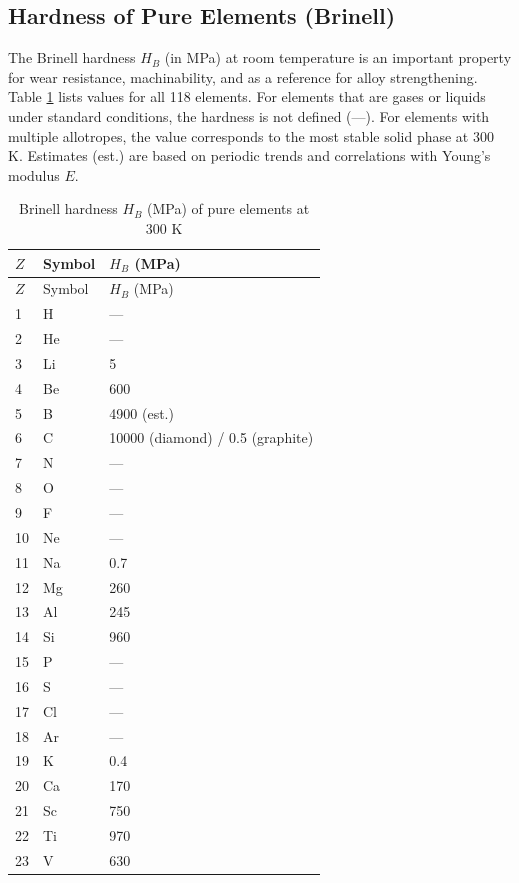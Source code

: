 \documentclass[12pt,a4paper]{article}
\begin{document}
	\subsection{Hardness of Pure Elements (Brinell)}
	\label{subsec:hardness}
	
	The Brinell hardness \(H_B\) (in MPa) at room temperature is an important property for wear resistance, machinability, and as a reference for alloy strengthening. Table \ref{tab:hardness-all} lists values for all 118 elements. For elements that are gases or liquids under standard conditions, the hardness is not defined (—). For elements with multiple allotropes, the value corresponds to the most stable solid phase at 300 K. Estimates (est.) are based on periodic trends and correlations with Young's modulus \(E\).
	
	\begin{longtable}{p{0.6cm}p{1.2cm}p{2.5cm}}
		\caption{Brinell hardness \(H_B\) (MPa) of pure elements at 300 K} \label{tab:hardness-all} \\
		\toprule
		\(Z\) & Symbol & \(H_B\) (MPa) \\
		\midrule
		\endfirsthead
		\toprule
		\(Z\) & Symbol & \(H_B\) (MPa) \\
		\midrule
		\endhead
		1  & H  & — \\
		2  & He & — \\
		3  & Li & 5 \\
		4  & Be & 600 \\
		5  & B  & 4900 (est.) \\
		6  & C  & 10000 (diamond) / 0.5 (graphite) \\
		7  & N  & — \\
		8  & O  & — \\
		9  & F  & — \\
		10 & Ne & — \\
		11 & Na & 0.7 \\
		12 & Mg & 260 \\
		13 & Al & 245 \\
		14 & Si & 960 \\
		15 & P  & — \\
		16 & S  & — \\
		17 & Cl & — \\
		18 & Ar & — \\
		19 & K  & 0.4 \\
		20 & Ca & 170 \\
		21 & Sc & 750 \\
		22 & Ti & 970 \\
		23 & V  & 630 \\

\end{longtable}
\end{document}
